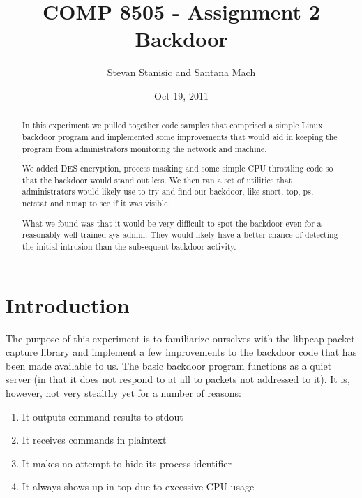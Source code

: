 \documentclass[titlepage]{article}
\begin{document}
\author{Stevan Stanisic and Santana Mach}
\title{COMP 8505 - Assignment 2 \\ Backdoor}
\date{Oct 19, 2011}
\maketitle{}

\tableofcontents
\pagebreak

\begin{abstract}

In this experiment we pulled together code samples that comprised
a simple Linux backdoor program and implemented some improvements
that would aid in keeping the program from administrators monitoring
the network and machine.

We added DES encryption, process masking and some simple CPU
throttling code so that the backdoor would stand out less. We then
ran a set of utilities that administrators would likely use to try
and find our backdoor, like snort, top, ps, netstat and nmap to
see if it was visible.

What we found was that it would be very difficult to spot the
backdoor even for a reasonably well trained sys-admin. They would
likely have a better chance of detecting the initial intrusion than
the subsequent backdoor activity.

\end{abstract}

\section{Introduction}

The purpose of this experiment is to familiarize ourselves with the
libpcap packet capture library and implement a few improvements to the
backdoor code that has been made available to us. The basic backdoor
program functions as a quiet server (in that it does not respond to at
all to packets not addressed to it). It is, however, not very stealthy
yet for a number of reasons:

\begin{enumerate}
	\item It outputs command results to stdout
	\item It receives commands in plaintext
	\item It makes no attempt to hide its process identifier
	\item It always shows up in top due to excessive CPU usage
\end{enumerate}
\end{document}
